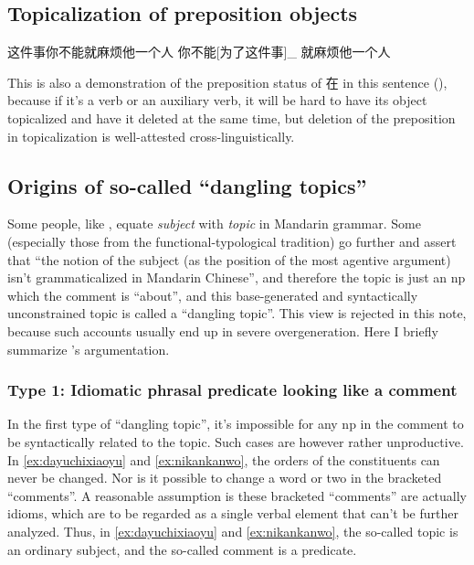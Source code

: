 \documentclass[UTF8, a4paper, oneside, scheme=plain]{ctexrep}
\newcommand*{\citesec}[1]{\S~{#1}}
\newcommand*{\term}[1]{\emph{#1}}
\begin{document}
\subsection{Topicalization of preposition objects}\label{sec:topicalization-of-preposition-objects}

\begin{exe}
    \ex\label{ex:zhejianshinibunengjiumafantayigeren} 这件事你不能就麻烦他一个人
    \ex 你不能[为了这件事]_{} 就麻烦他一个人
\end{exe}
This is also a demonstration of the preposition status of 在 in this sentence (),
because if it's a verb or an auxiliary verb,
it will be hard to have its object topicalized and have it deleted at the same time,
but deletion of the preposition in topicalization is well-attested cross-linguistically.

\subsection{Origins of so-called ``dangling topics''}\label{sec:topic-subject}

Some people, like \citet[\citesec{7.1}]{zhudexigrammar},
equate \term{subject} with \term{topic} in Mandarin grammar.
Some (especially those from the functional-typological tradition) go further 
and assert that ``the notion of the subject (as the position of the most agentive argument) 
isn't grammaticalized in Mandarin Chinese'',
and therefore the topic is just an \acs{np} which the comment is ``about'',
and this base-generated and syntactically unconstrained topic 
is called a ``dangling topic''.
This view is rejected in this note,
because such accounts usually end up in severe overgeneration. 
Here I briefly summarize \citet{sih2000topic}'s argumentation.

\subsubsection{Type 1: Idiomatic phrasal predicate looking like a comment}\label{sec:clause.dangling-topic.1}

In the first type of ``dangling topic'',
it's impossible for any \acs{np} in the comment to be syntactically related to the topic.
Such cases are however rather unproductive. 
In \eqref{ex:dayuchixiaoyu} and \eqref{ex:nikankanwo},
the orders of the constituents can never be changed.
Nor is it possible to change a word or two in the bracketed ``comments''.
A reasonable assumption is these bracketed ``comments''
are actually idioms, 
which are to be regarded as a single verbal element that can't be further analyzed.
Thus, in \eqref{ex:dayuchixiaoyu} and \eqref{ex:nikankanwo},
the so-called topic is an ordinary subject,
and the so-called comment is a predicate.
\end{document}

